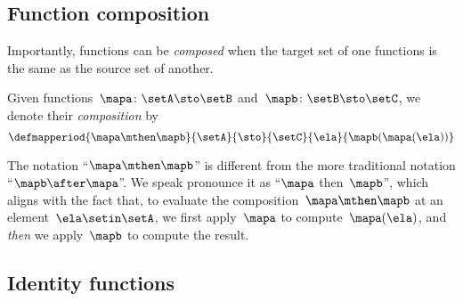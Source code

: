 \subsection{Function composition}

\begin{marginfigure}
    \centering
    \caption{}
    \label{fig:function_comp_figure}
\end{marginfigure}

\begin{marginfigure}
    \centering
    \caption{}
    \label{fig:function_comp_figure_b}
\end{marginfigure}

Importantly, functions can be \emph{composed} when the target set of one functions is the same as the source set of another.
\begin{ctdefinition}
    \label{def:composition-of-functions}
    Given functions~$\mapa\colon \setA \sto \setB$ and~$\mapb \colon \setB \sto \setC$, we denote their \emph{composition} by
    \begin{equation}
        \label{eq:composition-notation-functions}
        \defmapperiod{
            \mapa \mthen \mapb
        }{
            \setA
        }{
            \sto
        }{
            \setC
        }{
            \ela
        }{
            \mapb(\mapa(\ela))
        }
    \end{equation}
\end{ctdefinition}

The notation ``$\mapa \mthen \mapb$'' is different from the more traditional notation ``$\mapb \after \mapa$''.
We speak pronounce it as ``$\mapa$ then~$\mapb$'', which aligns with the fact that, to evaluate the composition~$\mapa \mthen \mapb$ at an element~$\ela \setin\setA$, we first apply~$\mapa$ to compute~$\mapa(\ela)$, and \emph{then} we apply~$\mapb$ to compute the result.

\subsection{Identity functions}

